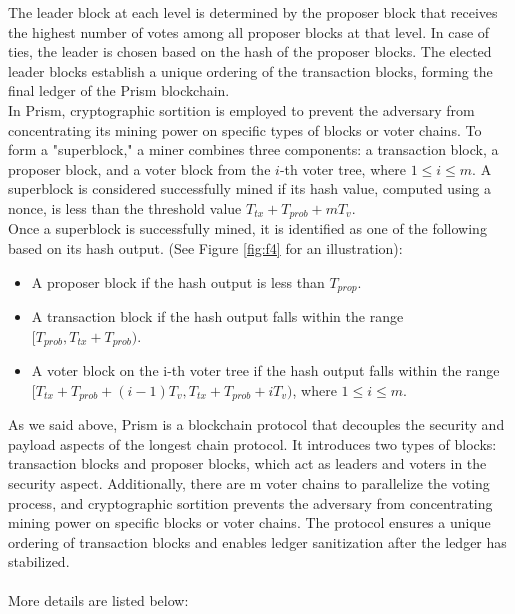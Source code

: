 \documentclass{report}
\begin{document}
The leader block at each level is determined by the proposer block that receives the highest number of votes among all proposer blocks at that level. In case of ties, the leader is chosen based on the hash of the proposer blocks. The elected leader blocks establish a unique ordering of the transaction blocks, forming the final ledger of the Prism blockchain.\\
In Prism, cryptographic sortition is employed to prevent the adversary from concentrating its mining power on specific types of blocks or voter chains. To form a "superblock," a miner combines three components: a transaction block, a proposer block, and a voter block from the $i$-th voter tree, where $1 ≤ i ≤ m$. A superblock is considered successfully mined if its hash value, computed using a nonce, is less than the threshold value $T_{tx} + T_{prob} + mT_{v}$.\\
Once a superblock is successfully mined, it is identified as one of the following based on its hash output. (See Figure \ref{fig:f4} for an illustration):\\
\begin{itemize}
	\item A proposer block if the hash output is less than $T_{prop}$.
	\item A transaction block if the hash output falls within the range $[T_{prob}, T_{tx} + T_{prob})$.
	\item A voter block on the i-th voter tree if the hash output falls within the range $[T_{tx} + T_{prob} + (i − 1)T_{v}, T_{tx} + T_{prob} + iT_{v})$, where $1 ≤ i ≤ m$.
\end{itemize}
As we said above, Prism is a blockchain protocol that decouples the security and payload aspects of the longest chain protocol. It introduces two types of blocks: transaction blocks and proposer blocks, which act as leaders and voters in the security aspect. Additionally, there are m voter chains to parallelize the voting process, and cryptographic sortition prevents the adversary from concentrating mining power on specific blocks or voter chains. The protocol ensures a unique ordering of transaction blocks and enables ledger sanitization after the ledger has stabilized.\\
\\
More details are listed below:
\\
\end{document}
